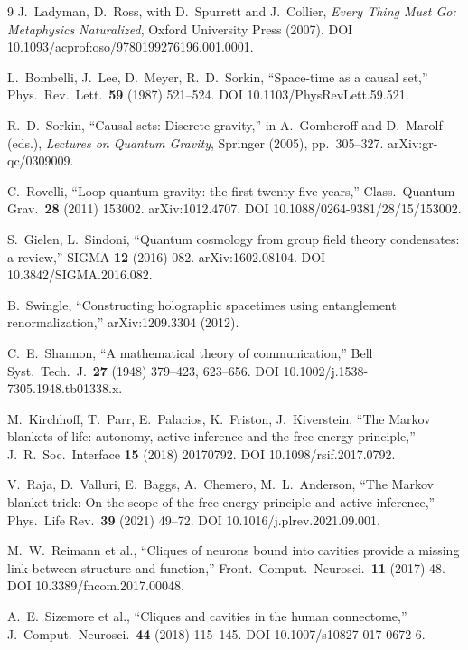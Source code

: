 \documentclass[12pt,a4paper,twoside]{article}
\theoremstyle{plain}
\theoremstyle{definition}
\theoremstyle{remark}
\begin{document}
\begin{thebibliography}{9}
J.~Ladyman, D.~Ross, with D.~Spurrett and J.~Collier,
\textit{Every Thing Must Go: Metaphysics Naturalized}, Oxford University
Press (2007). DOI 10.1093/acprof:oso/9780199276196.001.0001.

L.~Bombelli, J.~Lee, D.~Meyer, R.~D.~Sorkin, ``Space-time as a causal set,''
Phys.\ Rev.\ Lett.\ \textbf{59} (1987) 521--524.
DOI 10.1103/PhysRevLett.59.521.

R.~D.~Sorkin, ``Causal sets: Discrete gravity,'' in A.~Gomberoff and
D.~Marolf (eds.), \textit{Lectures on Quantum Gravity}, Springer (2005),
pp.~305--327. arXiv:gr-qc/0309009.

C.~Rovelli, ``Loop quantum gravity: the first twenty-five years,''
Class.\ Quantum Grav.\ \textbf{28} (2011) 153002.
arXiv:1012.4707. DOI 10.1088/0264-9381/28/15/153002.

S.~Gielen, L.~Sindoni, ``Quantum cosmology from group field theory
condensates: a review,'' SIGMA \textbf{12} (2016) 082.
arXiv:1602.08104. DOI 10.3842/SIGMA.2016.082.

B.~Swingle, ``Constructing holographic spacetimes using entanglement
renormalization,'' arXiv:1209.3304 (2012).

C.~E.~Shannon, ``A mathematical theory of communication,''
Bell Syst.\ Tech.\ J.\ \textbf{27} (1948) 379--423, 623--656.
DOI 10.1002/j.1538-7305.1948.tb01338.x.

M.~Kirchhoff, T.~Parr, E.~Palacios, K.~Friston, J.~Kiverstein,
``The Markov blankets of life: autonomy, active inference and the free-energy
principle,'' J.\ R.\ Soc.\ Interface \textbf{15} (2018) 20170792.
DOI 10.1098/rsif.2017.0792.

V.~Raja, D.~Valluri, E.~Baggs, A.~Chemero, M.~L.~Anderson,
``The Markov blanket trick: On the scope of the free energy principle and
active inference,'' Phys.\ Life Rev.\ \textbf{39} (2021) 49--72.
DOI 10.1016/j.plrev.2021.09.001.

M.~W.~Reimann et al., ``Cliques of neurons bound into cavities provide a
missing link between structure and function,'' Front.\ Comput.\ Neurosci.\
\textbf{11} (2017) 48. DOI 10.3389/fncom.2017.00048.

A.~E.~Sizemore et al., ``Cliques and cavities in the human connectome,''
J.\ Comput.\ Neurosci.\ \textbf{44} (2018) 115--145.
DOI 10.1007/s10827-017-0672-6.


\end{thebibliography}
\end{document}
